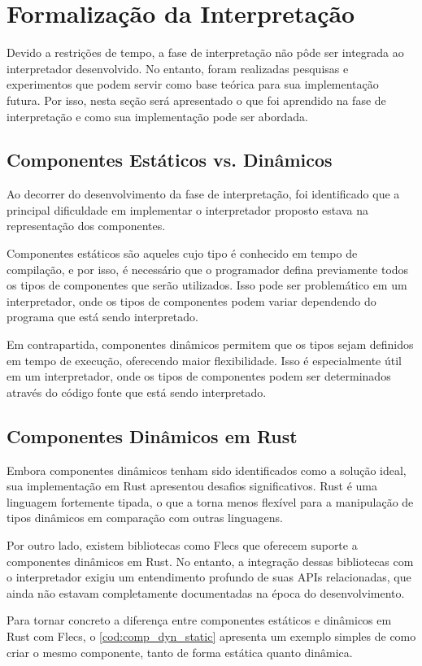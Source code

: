 \section{Formalização da Interpretação} \label{sec:interpretacao}

Devido a restrições de tempo, a fase de interpretação não pôde ser integrada ao interpretador desenvolvido. No entanto, foram realizadas pesquisas e experimentos que podem servir como base teórica para sua implementação futura. Por isso, nesta seção será apresentado o que foi aprendido na fase de interpretação e como sua implementação pode ser abordada.

\subsection{Componentes Estáticos vs. Dinâmicos}

Ao decorrer do desenvolvimento da fase de interpretação, foi identificado que a principal dificuldade em implementar o interpretador proposto estava na representação dos componentes.

Componentes estáticos são aqueles cujo tipo é conhecido em tempo de compilação, e por isso, é necessário que o programador defina previamente todos os tipos de componentes que serão utilizados. Isso pode ser problemático em um interpretador, onde os tipos de componentes podem variar dependendo do programa que está sendo interpretado.

Em contrapartida, componentes dinâmicos permitem que os tipos sejam definidos em tempo de execução, oferecendo maior flexibilidade. Isso é especialmente útil em um interpretador, onde os tipos de componentes podem ser determinados através do código fonte que está sendo interpretado.

\subsection{Componentes Dinâmicos em Rust}

Embora componentes dinâmicos tenham sido identificados como a solução ideal, sua implementação em Rust apresentou desafios significativos. Rust é uma linguagem fortemente tipada, o que a torna menos flexível para a manipulação de tipos dinâmicos em comparação com outras linguagens.

Por outro lado, existem bibliotecas como Flecs que oferecem suporte a componentes dinâmicos em Rust. No entanto, a integração dessas bibliotecas com o interpretador exigiu um entendimento profundo de suas APIs relacionadas, que ainda não estavam completamente documentadas na época do desenvolvimento.

Para tornar concreto a diferença entre componentes estáticos e dinâmicos em Rust com Flecs, o \autoref{cod:comp_dyn_static} apresenta um exemplo simples de como criar o mesmo componente, tanto de forma estática quanto dinâmica.

\codigoRust

\vspace{-1em}
